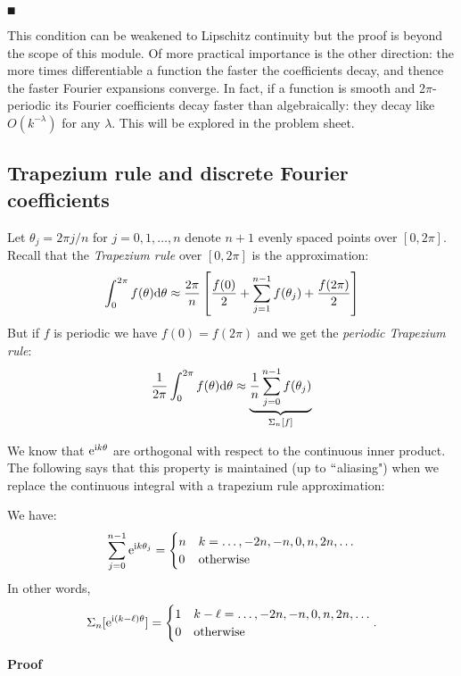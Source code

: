 \ensuremath{\QED}

This condition can be weakened to Lipschitz continuity but the proof is  beyond the scope of this module. Of more practical importance is the other direction: the more times differentiable a function the faster the coefficients decay, and thence the faster Fourier expansions converge. In fact, if a function is smooth and 2\ensuremath{\pi}-periodic its Fourier coefficients decay faster than algebraically: they decay like $O(k^{-\ensuremath{\lambda}})$ for any $\ensuremath{\lambda}$. This will be explored in the problem sheet.

\subsection{Trapezium rule and discrete Fourier coefficients}
\begin{definition} Let $\ensuremath{\theta}_j = 2\ensuremath{\pi}j/n$ for $j = 0,1,\ensuremath{\ldots},n$ denote $n+1$ evenly spaced points over $[0,2\ensuremath{\pi}]$. Recall that the \emph{Trapezium rule} over $[0,2\ensuremath{\pi}]$ is the approximation:
\[
\ensuremath{\int}_0^{2\ensuremath{\pi}} f(\ensuremath{\theta}) {\rm d}\ensuremath{\theta} \ensuremath{\approx} {2 \ensuremath{\pi} \over n} \left[{f(0) \over 2} + \ensuremath{\sum}_{j=1}^{n-1} f(\ensuremath{\theta}_j) + {f(2 \ensuremath{\pi}) \over 2} \right]
\]
But if $f$ is periodic we have $f(0) = f(2\ensuremath{\pi})$ and we get the \emph{periodic Trapezium rule}:
\[
{1 \over 2\ensuremath{\pi}} \ensuremath{\int}_0^{2\ensuremath{\pi}} f(\ensuremath{\theta}) {\rm d}\ensuremath{\theta} \ensuremath{\approx} \underbrace{{1 \over n} \ensuremath{\sum}_{j=0}^{n-1} f(\ensuremath{\theta}_j)}_{\ensuremath{\Sigma}_n[f]}
\]
\end{definition}

We know that ${\rm e}^{{\rm i} k \theta}$ are orthogonal with respect to the continuous inner product. The following says that this property is maintained (up to \ensuremath{\ldq}aliasing") when we replace the continuous integral with a trapezium rule approximation:

\begin{lemma} We have:
\[
\sum_{j=0}^{n-1} {\rm e}^{{\rm i} k \theta_j} =
\begin{cases} n & k = \ldots,-2n,-n,0,n,2n,\ldots  \cr
              0 & \hbox{otherwise}
\end{cases}
\]
In other words,
\[
\Sigma_n[{\rm e}^{{\rm i} (k-\ell) \theta}] =
\begin{cases} 1 & k-\ell = \ldots,-2n,-n,0,n,2n,\ldots  \cr
              0 & \hbox{otherwise}
\end{cases}.
\]
\end{lemma}
\textbf{Proof}

